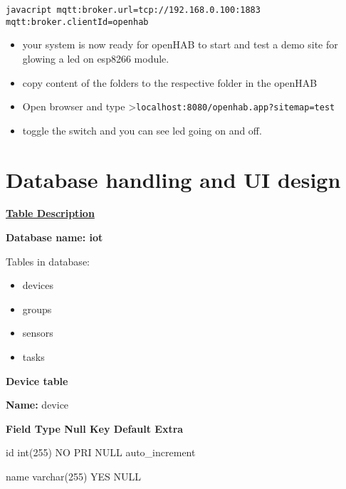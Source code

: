 \documentclass[16pt]{article}
\begin{document}
\texttt{javacript       mqtt:broker.url=tcp://192.168.0.100:1883       mqtt:broker.clientId=openhab}

\begin{itemize}


\item your system is now ready for openHAB to start and test a demo site for
glowing a led on esp8266 module.
\item copy content of the folders to the
respective folder in the openHAB 
\item Open browser and type
\textgreater{}\texttt{localhost:8080/openhab.app?sitemap=test}
\item toggle
the switch and you can see led going on and off.

\end{itemize}

\vspace{8cm}

\section{Database handling and UI design\\}

\vspace{0.3cm}
{\Large{\underline{\textbf{Table Description}}}}
\vspace{0.2cm}

\textbf{Database name: iot}

Tables in database: 

\begin{itemize}

\item devices
\item groups 
\item sensors
\item tasks  

\end{itemize}

\textbf{Device table}

\textbf{Name:} device

\textbf{\textbar{} Field \textbar{} Type \textbar{} Null \textbar{} Key
\textbar{} Default \textbar{} Extra \textbar{}}

\textbar{} id \textbar{} int(255) \textbar{} NO \textbar{} PRI
\textbar{} NULL \textbar{} auto\_increment \textbar{}

\textbar{} name \textbar{} varchar(255) \textbar{} YES \textbar{}
\textbar{} NULL \textbar{} \textbar{}
\end{document}
